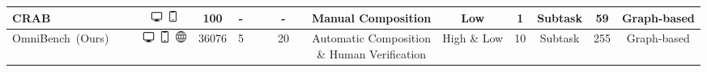 \documentclass[letterpaper]{article} %
\newcommand{\tick}{\textcolor{green}{\ding{51}}}
\newcommand{\cross}{\textcolor{red}{\ding{55}}}
\begin{document}
\begin{table}[h!]
{\begin{tabular}{l|ccc|cccccccc|cccc}
 CRAB~\cite{crab} & \tick & \tick & \includegraphics[width=0.4cm]{image/desktop.png} \includegraphics[width=0.4cm]{image/mobile.png} & 100 & - & \tick & \cross & - & \cross & Manual Composition & Low & 1 & Subtask & 59 & Graph-based \\ \hline
 OmniBench~(Ours) & \tick & \tick & \includegraphics[width=0.4cm]{image/desktop.png} \includegraphics[width=0.4cm]{image/mobile.png} \includegraphics[width=0.4cm]{image/web.png} & 36076 & 5 & \tick & \tick & 20 & \tick & \makecell{Automatic Composition \\ \& Human Verification} & High \& Low & 10 & Subtask & 255 & Graph-based

 
 \\ \bottomrule
\end{tabular}%
}
\label{tab1}
\vspace{-6mm}
\end{table}
\end{document}
